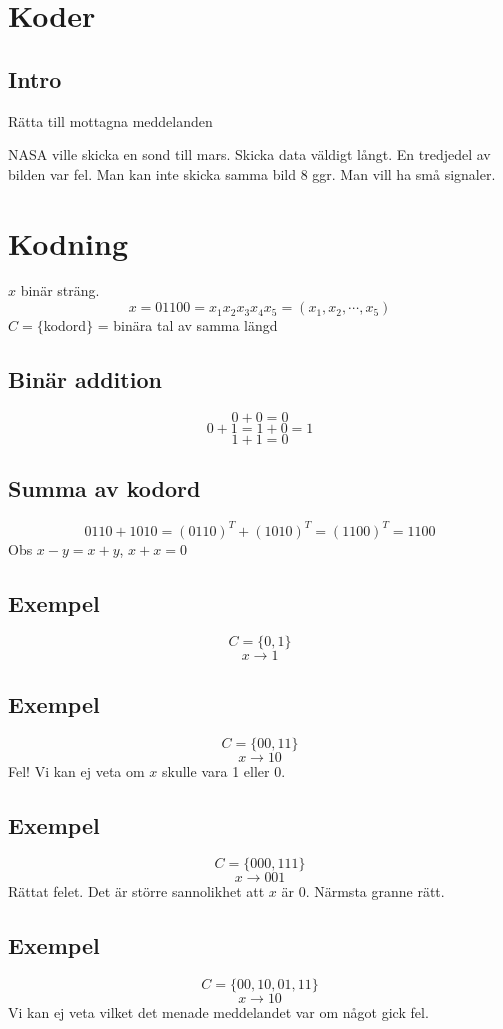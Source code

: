 \documentclass{article}
\begin{document}
\section{Koder}
\subsection{Intro}
Rätta till mottagna meddelanden

NASA ville skicka en sond till mars. Skicka data väldigt långt. En tredjedel av bilden var fel.
Man kan inte skicka samma bild 8 ggr. Man vill ha små signaler.

\section{Kodning}
$x$ binär sträng.
$$x = 01100 = x_1 x_2 x_3 x_4 x_5 = ( x_1,x_2,\cdots, x_5 ) $$
$C=\{$kodord$\}$ = binära tal av samma längd

\subsection{Binär addition}
$$ 0+0=0 $$
$$ 0+1=1+0=1 $$
$$ 1+1=0 $$

\subsection{Summa av kodord}
$$ 0110+1010=(0 1 1 0)^T+(1 0 1 0)^T=(1 1 0 0)^T=1100 $$
Obs $x-y = x+y$, $x+x=0$

\subsection{Exempel}
$$ C=\{0,1\} $$
$$ x\to 1 $$

\subsection{Exempel}
$$ C=\{00,11\} $$
$$ x\to 10 $$
Fel! Vi kan ej veta om $x$ skulle vara 1 eller 0.

\subsection{Exempel}
$$ C=\{000,111\} $$
$$ x\to 001 $$ Rättat felet.
Det är större sannolikhet att $x$ är 0.
Närmsta granne rätt.

\subsection{Exempel}
$$ C=\{00,10,01,11\} $$
$$ x\to 10 $$
Vi kan ej veta vilket det menade meddelandet var om något gick fel.
\end{document}
